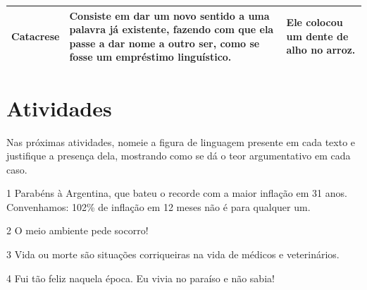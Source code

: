 \begin{longtable}[]{@{}lll@{}}
\begin{minipage}[t]{0.29\columnwidth}
Catacrese\strut
\end{minipage} & \begin{minipage}[t]{0.29\columnwidth}\raggedright
Consiste em dar um novo sentido a uma palavra já existente, fazendo com
que ela passe a dar nome a outro ser, como se fosse um empréstimo
linguístico.\strut
\end{minipage} & \begin{minipage}[t]{0.29\columnwidth}\raggedright
Ele colocou um dente de alho no arroz.\strut
\end{minipage}\tabularnewline
\bottomrule
\end{longtable}

\section*{Atividades}

Nas próximas atividades, nomeie a figura de linguagem presente em cada
texto e justifique a presença dela, mostrando como se dá o teor
argumentativo em cada caso.


\num{1} Parabéns à Argentina, que bateu o recorde com a maior inflação
em 31 anos. Convenhamos: 102\% de inflação em 12 meses não é para
qualquer um.


\num{2} O meio ambiente pede socorro!


\num{3} Vida ou morte são situações corriqueiras na vida de médicos e
veterinários.


\num{4} Fui tão feliz naquela época. Eu vivia no paraíso e não sabia!



